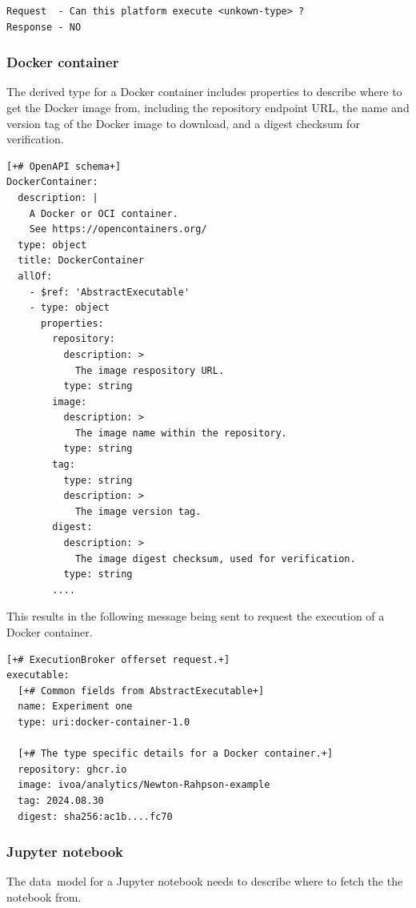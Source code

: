 \documentclass[11pt,a4paper]{ivoa}
\newcommand{\datamodel} {data~model}
\newcommand{\jupyternotebook} {Jupyter notebook}
\newcommand{\dockerimage} {Docker image}
\newcommand{\dockercontainer} {Docker container}
\begin{document}
\begin{lstlisting}[]
Request  - Can this platform execute <unkown-type> ?
Response - NO
\end{lstlisting}

\subsubsection{\dockercontainer{}}
\label{subsub-dockercontainer}

The derived type for a \dockercontainer{} includes properties
to describe where to get the \dockerimage{} from, including the repository endpoint URL,
the name and version tag of the \dockerimage{} to download, and a digest checksum for
verification.

\begin{lstlisting}[]
[+# OpenAPI schema+]
DockerContainer:
  description: |
    A Docker or OCI container.
    See https://opencontainers.org/
  type: object
  title: DockerContainer
  allOf:
    - $ref: 'AbstractExecutable'
    - type: object
      properties:
        repository:
          description: >
            The image respository URL.
          type: string
        image:
          description: >
            The image name within the repository.
          type: string
        tag:
          type: string
          description: >
            The image version tag.
        digest:
          description: >
            The image digest checksum, used for verification.
          type: string
        ....
\end{lstlisting}

This results in the following message being sent to request the execution
of a \dockercontainer{}.
\begin{lstlisting}[]
[+# ExecutionBroker offerset request.+]
executable:
  [+# Common fields from AbstractExecutable+]
  name: Experiment one
  type: uri:docker-container-1.0

  [+# The type specific details for a Docker container.+]
  repository: ghcr.io
  image: ivoa/analytics/Newton-Rahpson-example
  tag: 2024.08.30
  digest: sha256:ac1b....fc70
\end{lstlisting}

\subsubsection{\jupyternotebook{}}
\label{subsub-jupyternotebook}
The \datamodel{} for a \jupyternotebook{} needs to describe where to fetch the
the notebook from.
\end{document}
